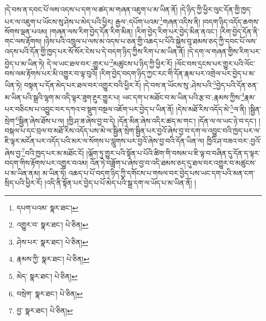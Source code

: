 །དེ་བས་ན་དབང་པོ་ལས་འདས་པ་དག་ལ་ཚད་མ་གཞན་འཇུག་པ་མ་ཡིན་ནོ། །དེ་ཉིད་ཀྱི་ཕྱིར་ལུང་དོན་གྱི་ཁྱད་པར་ལ་འཇུག་པ་ཡོངས་སུ་ཤེས་པ་མེད་པའི་ཕྱིར། རྒྱལ་:དཔོག་པའམ་\footnote{དཔག་པའམ་  སྣར་ཐང་། }གཞན་འདིས་ནི། །བདག་ཉིད་འདོད་ཆགས་སོགས་ལྡན་པའམ། །གཞན་ལས་རིག་བྱེད་དོན་རིག་མིན། །རིག་བྱེད་རིག་པར་བྱེད་མིན་ནའང་། །རིག་བྱེད་དོན་ནི་གང་ལས་རྟོགས། །ཉེས་པའི་འཁྲུལ་པ་ལས་མ་འདས་པ་ཅན་གྱི་འཆད་པ་པོའི་སྐྱེས་བུ་ཐམས་ཅད་ཀྱི་དབང་པོ་ལས་འདས་པའི་དོན་གྱི་ཁྱད་པར་སོ་སོར་ངེས་པ་དེ་བདག་ཉིད་ཀྱིས་རིག་པ་མ་ཡིན་ནོ། །དེ་དག་ལ་གཞན་གྱིས་རིག་པར་བྱེད་པ་མ་ཡིན་ཏེ། དེ་ལ་ཡང་ཐལ་བར་:གྱུར་པ་\footnote{འགྱུར་བ་  སྣར་ཐང་།  པེ་ཅིན། }མཚུངས་པ་ཉིད་ཀྱི་ཕྱིར་རོ། །ལོང་བས་དྲངས་པར་གྱུར་པའི་ལོང་བས་ལམ་རྟོགས་པར་མི་འགྱུར་བ་ལྟ་བུའོ། །རིག་བྱེད་བདག་ཉིད་ཀྱང་རང་གི་དོན་རྣམ་པར་འགྲེལ་པར་བྱེད་པ་མ་ཡིན་ཏེ། བསྟན་པ་དོན་མེད་པར་ཐལ་བར་འགྱུར་བའི་ཕྱིར་རོ། །དེ་བས་ན་ཡོངས་སུ་:ཤེས་པའི་\footnote{ཤེས་པར་  སྣར་ཐང་།  པེ་ཅིན། }བྱེད་པའི་དོན་ཅན་མ་ཡིན་པའི་སྒྲའི་ལྷག་མ་འདི་ལྟར་ཟུག་རྔུར་གྱུར་པ། ཡང་དག་པ་མཐོང་བ་མ་ཡིན་པའི་རྩ་བ་:རྣམས་ཀྱིས་\footnote{རྣམས་ཀྱི་  སྣར་ཐང་།  པེ་ཅིན། }རྣམ་པར་བཅིངས་པ་འབྱུང་བར་དཀའ་བ་སྡུག་བསྔལ་འཇོག་པར་བྱེད་པ་ཡིན་ནོ། །དེས་མཐོ་རིས་འདོད་མེ་\footnote{མེད་  སྣར་ཐང་།  པེ་ཅིན། }ལ་ནི། །སྦྱིན་སྲེག་\footnote{བསྲེག་  སྣར་ཐང་།  པེ་ཅིན། }སྦྱིན་ཞེས་ཐོས་པ་ལ། །ཁྱི་ཤ་ཟ་ཞེས་བྱ་བ་དེ། །དོན་མིན་ཞེས་འདིར་ཚད་མ་གང་། །དོན་ལ་ལ་ཡང་ཉེ་བ་དང་། །བསྐལ་པ་དང་བྲལ་བ་མཐོ་རིས་འདོད་པས་མེ་ལ་སྦྱིན་སྲེག་སྦྱིན་པར་བྱའོ་ཞེས་བྱ་བ་དག་ལ་འབྱུང་བའི་ཁྱད་པར་ལ་ཇི་ལྟར་མངོན་པར་འདོད་པའི་མར་ལ་སོགས་པ་བླུགས་པར་བྱའོ་ཞེས་བྱ་བའི་དོན་ཡིན་ལ། ཁྱིའི་ཤ་བཟའ་བར་:བྱའོ་ཞེས་བྱ་\footnote{བྱ་  སྣར་ཐང་།  པེ་ཅིན། }བའི་ཁྱད་པར་མ་མཐོང་ངོ། །ལྐོག་ཏུ་གྱུར་པའི་སྟོན་པ་པོའི་ཚིག་གི་བསམ་པ་ཇི་ལྟ་བ་བཞིན་དུ་དོན་ད་ལྟར་བདག་གིས་རྟོགས་པར་འགྱུར་བའམ། འོན་ཏེ་བཟློག་པ་ཞེས་བྱ་བ་འདི་ཐམས་ཅད་དུ་ཐལ་བར་འགྱུར་བ་མཚུངས་པ་མ་ཡིན་ནམ། མ་ཡིན་ཏེ། འཆད་པ་པོ་བདག་ཉིད་ཀྱི་དགོངས་པ་གསལ་བར་བྱེད་པས་ཡང་དག་པའི་མན་ངག་སྲིད་པའི་ཕྱིར་རོ། །འདི་ནི་སྟོན་པར་བྱེད་པ་པོ་མེད་པའི་སྒྲ་དག་ལ་ཡོད་པ་མ་ཡིན་ནོ། །
